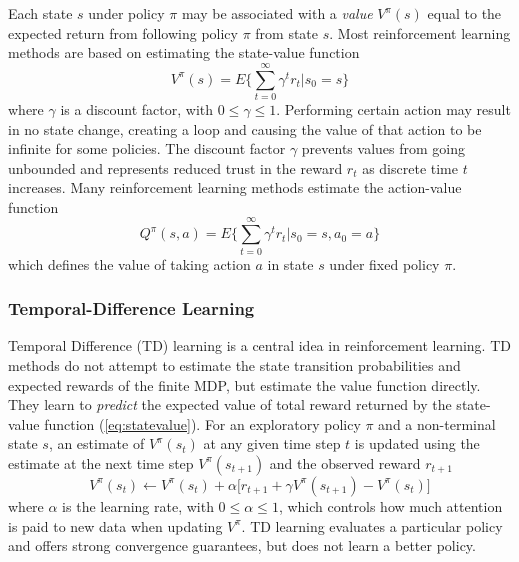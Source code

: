 Each state $s$ under policy $\pi$ may be associated with a \textit{value}
$V^\pi(s)$ equal to the expected return from following policy $\pi$ from state
$s$.  Most reinforcement learning methods are based on estimating the
state-value function
\begin{equation}
\label{eq:statevalue}
V^\pi(s) = E \Bigg\lbrace \sum^\infty_{t=0} \gamma^t r_t \Bigg\vert s_0 = s
\Bigg\rbrace
\end{equation}
where $\gamma$ is a discount factor, with $0\leq \gamma \leq 1$.
Performing certain action may result in no state change, creating a loop and
causing the value of that action to be infinite for some policies.
The discount factor $\gamma$ prevents values from going unbounded and
represents reduced trust in the reward $r_t$ as discrete time $t$
increases.  Many reinforcement learning methods estimate the action-value
function
\begin{equation}
\label{eq:actionvalue}
Q^\pi(s,a) = E \Bigg\lbrace \sum^\infty_{t=0} \gamma^t r_t \Bigg\vert s_0 = s,
a_0 = a \Bigg\rbrace
\end{equation}
which defines the value of taking action $a$ in state $s$ under fixed policy
$\pi$.

\subsubsection{Temporal-Difference Learning}
Temporal Difference (TD) learning is a central idea in reinforcement learning.
TD methods do not attempt to estimate the state transition probabilities and
expected rewards of the finite MDP, but estimate the value function directly.
They learn to \textit{predict} the expected value of total reward returned by
the state-value function (\ref{eq:statevalue}).  For an exploratory policy $\pi$
and a non-terminal state $s$, an estimate of $V^\pi(s_t)$ at any given time step
$t$ is updated using the estimate at the next time step $V^\pi(s_{t+1})$ and the
observed reward $r_{t+1}$
\begin{equation}
V^\pi(s_t) \leftarrow V^\pi(s_t) + \alpha \bigl[r_{t+1} + \gamma
V^\pi(s_{t+1}) - V^\pi(s_t) \bigr]
\end{equation}
where $\alpha$ is the learning rate, with $0 \leq \alpha \leq 1$, which controls
how much attention is paid to new data when updating $V^\pi$.  TD learning
evaluates a particular policy and offers strong convergence guarantees, but does
not learn a better policy.

